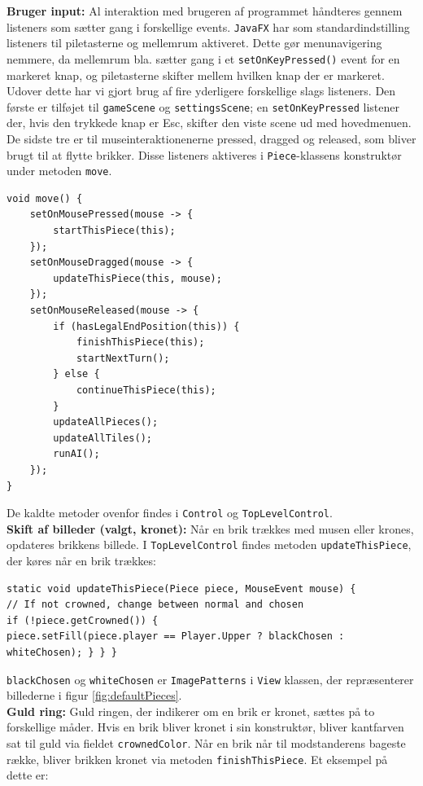 \textbf{Bruger input:} Al interaktion med brugeren af programmet håndteres gennem listeners som sætter gang i forskellige events. \texttt{JavaFX} har som standardindstilling listeners til piletasterne og mellemrum aktiveret. Dette gør menunavigering nemmere, da mellemrum bla. sætter gang i et \texttt{setOnKeyPressed()} event for en markeret knap, og piletasterne skifter mellem hvilken knap der er markeret. Udover dette har vi gjort brug af fire yderligere forskellige slags listeners. Den første er tilføjet til \texttt{gameScene} og \texttt{settingsScene}; en \texttt{setOnKeyPressed} listener der, hvis den trykkede knap er Esc, skifter den viste scene ud med hovedmenuen. De sidste tre er til museinteraktionenerne pressed, dragged og released, som bliver brugt til at flytte brikker. Disse listeners aktiveres i \texttt{Piece}-klassens konstruktør under metoden \texttt{move}.
\begin{lstlisting}
void move() {
    setOnMousePressed(mouse -> {
        startThisPiece(this);
    });
    setOnMouseDragged(mouse -> {
        updateThisPiece(this, mouse);
    });
    setOnMouseReleased(mouse -> {
        if (hasLegalEndPosition(this)) {
            finishThisPiece(this);
            startNextTurn();
        } else {
            continueThisPiece(this);
    	}
        updateAllPieces();
        updateAllTiles();
        runAI();
    });
}
\end{lstlisting}
De kaldte metoder ovenfor findes i \texttt{Control} og \texttt{TopLevelControl}. \\

\textbf{Skift af billeder (valgt, kronet):} Når en brik trækkes med musen eller krones, opdateres brikkens billede. I \texttt{TopLevelControl} findes metoden \texttt{updateThisPiece}, der køres når en brik trækkes:
\begin{lstlisting}
static void updateThisPiece(Piece piece, MouseEvent mouse) {
// If not crowned, change between normal and chosen 
if (!piece.getCrowned()) {
piece.setFill(piece.player == Player.Upper ? blackChosen : whiteChosen); } } }
\end{lstlisting}

\texttt{blackChosen} og \texttt{whiteChosen} er \texttt{ImagePatterns} i \texttt{View} klassen, der repræsenterer billederne i figur \ref{fig:defaultPieces}.  \\

\textbf{Guld ring:} Guld ringen, der indikerer om en brik er kronet, sættes på to forskellige måder. Hvis en brik bliver kronet i sin konstruktør, bliver kantfarven sat til guld via fieldet \texttt{crownedColor}. Når en brik når til modstanderens bageste række, bliver brikken kronet via metoden \texttt{finishThisPiece}. Et eksempel på dette er: 

